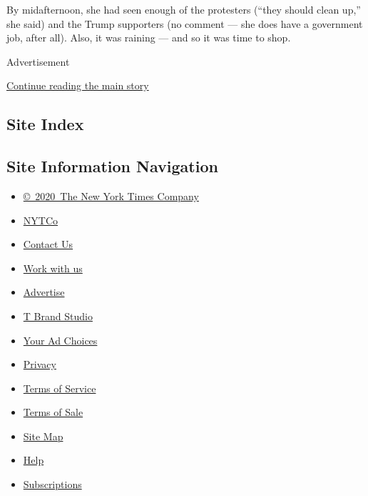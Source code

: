 By midafternoon, she had seen enough of the protesters (``they should
clean up,'' she said) and the Trump supporters (no comment --- she does
have a government job, after all). Also, it was raining --- and so it
was time to shop.

Advertisement

\protect\hyperlink{after-bottom}{Continue reading the main story}

\hypertarget{site-index}{%
\subsection{Site Index}\label{site-index}}

\hypertarget{site-information-navigation}{%
\subsection{Site Information
Navigation}\label{site-information-navigation}}

\begin{itemize}
\tightlist
\item
  \href{https://help.nytimes3xbfgragh.onion/hc/en-us/articles/115014792127-Copyright-notice}{©~2020~The
  New York Times Company}
\end{itemize}

\begin{itemize}
\tightlist
\item
  \href{https://www.nytco.com/}{NYTCo}
\item
  \href{https://help.nytimes3xbfgragh.onion/hc/en-us/articles/115015385887-Contact-Us}{Contact
  Us}
\item
  \href{https://www.nytco.com/careers/}{Work with us}
\item
  \href{https://nytmediakit.com/}{Advertise}
\item
  \href{http://www.tbrandstudio.com/}{T Brand Studio}
\item
  \href{https://www.nytimes3xbfgragh.onion/privacy/cookie-policy\#how-do-i-manage-trackers}{Your
  Ad Choices}
\item
  \href{https://www.nytimes3xbfgragh.onion/privacy}{Privacy}
\item
  \href{https://help.nytimes3xbfgragh.onion/hc/en-us/articles/115014893428-Terms-of-service}{Terms
  of Service}
\item
  \href{https://help.nytimes3xbfgragh.onion/hc/en-us/articles/115014893968-Terms-of-sale}{Terms
  of Sale}
\item
  \href{https://spiderbites.nytimes3xbfgragh.onion}{Site Map}
\item
  \href{https://help.nytimes3xbfgragh.onion/hc/en-us}{Help}
\item
  \href{https://www.nytimes3xbfgragh.onion/subscription?campaignId=37WXW}{Subscriptions}
\end{itemize}
